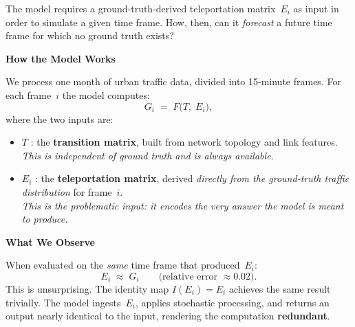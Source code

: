 \documentclass[11pt]{article}
\begin{document}
\pagestyle{empty}
\color{darktext}

\begin{corequestion}
The model requires a ground-truth-derived teleportation matrix~$E_i$ as input in order to simulate a given time frame.
How, then, can it \emph{forecast} a future time frame for which no ground truth exists?
\end{corequestion}

\textbf{\large How the Model Works}

\smallskip
We process one month of urban traffic data, divided into 15-minute frames.
For each frame~$i$ the model computes:
%
\[
  G_i \;=\; F\!\bigl(T,\; E_i\bigr),
\]
%
where the two inputs are:

\begin{itemize}[leftmargin=1.6em, itemsep=4pt]
  \item[\textcolor{accentblue}{\textbullet}]
    $T$ : the \textbf{transition matrix}, built from network topology and link features.\\
    \textit{This is independent of ground truth and is always available.}

  \item[\textcolor{accentred}{\textbullet}]
    $E_i$ : the \textbf{teleportation matrix}, derived \emph{directly from the ground-truth traffic distribution} for frame~$i$.\\
    \textit{This is the problematic input: it encodes the very answer the model is meant to produce.}
\end{itemize}

\textbf{\large What We Observe}

\begin{evidencebox}[title={Observation 1 — Same-frame evaluation}]
When evaluated on the \emph{same} time frame that produced~$E_i$:
\[
  E_i \;\approx\; G_i
  \qquad\text{(relative error $\approx 0.02$).}
\]
This is unsurprising. The identity map $I(E_i) = E_i$ achieves the same result trivially.
The model ingests~$E_i$, applies stochastic processing, and returns an output nearly identical to the input, rendering the computation \textbf{redundant}.
\end{evidencebox}
\end{document}
